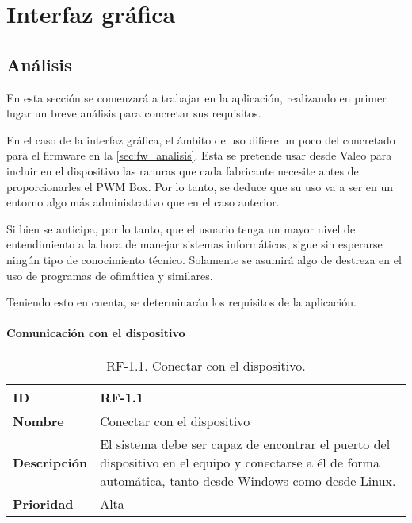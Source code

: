 \chapter{Interfaz gráfica}
\label{ch:ui}

\section{Análisis}

En esta sección se comenzará a trabajar en la aplicación, realizando en primer lugar un breve análisis para concretar sus requisitos.

En el caso de la interfaz gráfica, el ámbito de uso difiere un poco del concretado para el firmware en la \autoref{sec:fw_analisis}. Esta se pretende usar desde Valeo para incluir en el dispositivo las ranuras que cada fabricante necesite antes de proporcionarles el PWM Box. Por lo tanto, se deduce que su uso va a ser en un entorno algo más administrativo que en el caso anterior.

Si bien se anticipa, por lo tanto, que el usuario tenga un mayor nivel de entendimiento a la hora de manejar sistemas informáticos, sigue sin esperarse ningún tipo de conocimiento técnico. Solamente se asumirá algo de destreza en el uso de programas de ofimática y similares.

Teniendo esto en cuenta, se determinarán los requisitos de la aplicación.

\subsubsection{Comunicación con el dispositivo}

\begin{table}[h!]
    \centering
    \begin{tabular}{|m{2.5cm}|m{9.27cm}|}
        \hline
        \textbf{ID} & RF-1.1 \\
        \hline
        \textbf{Nombre} & Conectar con el dispositivo \\
        \hline
        \textbf{Descripción} & El sistema debe ser capaz de encontrar el puerto del dispositivo en el equipo y conectarse a él de forma automática, tanto desde Windows como desde Linux. \\
        \hline
        \textbf{Prioridad} & Alta \\
        \hline
    \end{tabular}
    \caption{RF-1.1. Conectar con el dispositivo.}
\end{table}

